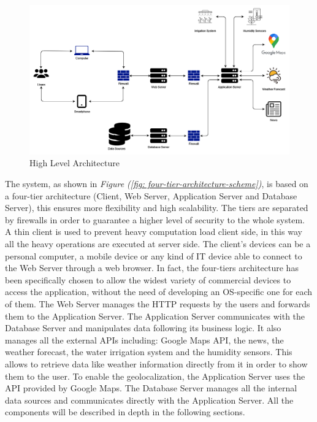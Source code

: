 \documentclass[table, 12pt]{article}
\begin{document}
\begin{center}
    \begin{figure}[H]
        \includegraphics[scale=0.70, center]{assets/4-tier-architecture-scheme.png}
        \caption{High Level Architecture}
        \label{fig: high_level_architecture}
    \end{figure}
\end{center}

The system, as shown in \textit{Figure (\ref{fig: four-tier-architecture-scheme})}, is based on a four-tier architecture (Client, Web Server, Application Server and Database Server), this ensures more flexibility and high scalability.
The tiers are separated by firewalls in order to guarantee a higher level of security to the whole system.
A thin client is used to prevent heavy computation load client side, in this way all the heavy operations are executed at server side.
The client's devices can be a personal computer, a mobile device or any kind of IT device able to connect to the Web Server through a web browser. In fact, the four-tiers architecture has been specifically chosen to allow the widest variety of commercial devices to access the application, without the need of developing an OS-specific one for each of them.
The Web Server manages the HTTP requests by the users and forwards them to the Application Server.
The Application Server communicates with the Database Server and manipulates data following its business logic.
It also manages all the external APIs including: Google Maps API, the news, the weather forecast, the water irrigation system and the humidity sensors.
This allows to retrieve data like weather information directly from it in order to show them to the user.
To enable the geolocalization, the Application Server uses the API provided by Google Maps.
The Database Server manages all the internal data sources and communicates directly with the Application Server.
All the components will be described in depth in the following sections.
\end{document}
